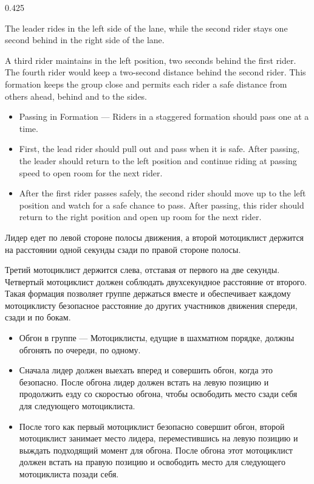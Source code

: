 	
\begin{langblock}{0.425}
	\begin{eng}
		
		The leader rides in the left side of the lane, while the second rider stays one second behind in the right side of the lane.
		
		A third rider maintains in the left position, two seconds behind the first rider. The fourth rider would keep a two-second distance behind the second rider. This formation keeps the group close and permits each rider a safe distance from others ahead, behind and to the sides.
		
		\begin{itemize}[noitemsep]
			\item Passing in Formation --- Riders in a staggered formation should pass one at a time.
			\item First, the lead rider should pull out and pass when it is safe. After passing, the leader should return to the left position and continue riding at passing speed to open room for the next rider.
			\item After the first rider passes safely, the second rider should move up to the left position and watch for a safe chance to pass. After passing, this rider should return to the right position and open up room for the next rider.
		\end{itemize}
	\end{eng}
	\begin{rus}
		Лидер едет по левой стороне полосы движения, а второй мотоциклист держится на расстоянии одной секунды сзади по правой стороне полосы.
		
		Третий мотоциклист держится слева, отставая от первого на две секунды. Четвертый мотоциклист должен соблюдать двухсекундное расстояние от второго. Такая формация позволяет группе держаться вместе и обеспечивает каждому мотоциклисту безопасное расстояние до других участников движения спереди, сзади и по бокам.
		
		\begin{itemize}[noitemsep]
			\item Обгон в группе --- Мотоциклисты, едущие в шахматном порядке, должны обгонять по очереди, по одному.
			\item Сначала лидер должен выехать вперед и совершить обгон, когда это безопасно. После обгона лидер должен встать на левую позицию и продолжить езду со скоростью обгона, чтобы освободить место сзади себя для следующего мотоциклиста.
			\item После того как первый мотоциклист безопасно совершит обгон, второй мотоциклист занимает место лидера, переместившись на левую позицию и выждать подходящий момент для обгона. После обгона этот мотоциклист должен встать на правую позицию и освободить место для следующего мотоциклиста позади себя.
		\end{itemize}
\end{rus}
\end{langblock}





